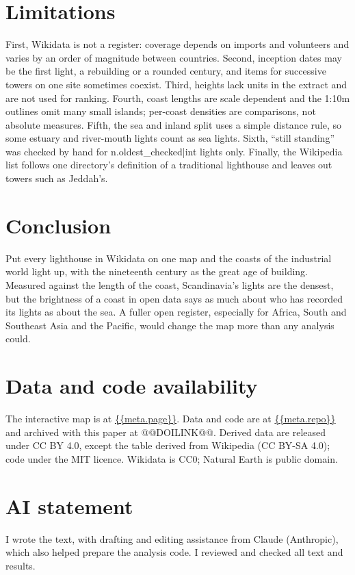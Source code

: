 \documentclass[11pt,a4paper]{article}
\begin{document}
\section{Limitations}
First, Wikidata is not a register: coverage depends on imports and volunteers and varies by an order of magnitude between countries. Second, inception dates may be the first light, a rebuilding or a rounded century, and items for successive towers on one site sometimes coexist. Third, heights lack units in the extract and are not used for ranking. Fourth, coast lengths are scale dependent and the 1:10m outlines omit many small islands; per-coast densities are comparisons, not absolute measures. Fifth, the sea and inland split uses a simple distance rule, so some estuary and river-mouth lights count as sea lights. Sixth, ``still standing'' was checked by hand for {{n.oldest_checked|int}} lights only. Finally, the Wikipedia list follows one directory's definition of a traditional lighthouse and leaves out towers such as Jeddah's.

\section{Conclusion}
Put every lighthouse in Wikidata on one map and the coasts of the industrial world light up, with the nineteenth century as the great age of building. Measured against the length of the coast, Scandinavia's lights are the densest, but the brightness of a coast in open data says as much about who has recorded its lights as about the sea. A fuller open register, especially for Africa, South and Southeast Asia and the Pacific, would change the map more than any analysis could.

\section*{Data and code availability}
The interactive map is at \url{{{meta.page}}}. Data and code are at \url{{{meta.repo}}} and archived with this paper at @@DOILINK@@. Derived data are released under CC BY 4.0, except the table derived from Wikipedia (CC BY-SA 4.0); code under the MIT licence. Wikidata is CC0; Natural Earth is public domain.

\section*{AI statement}
I wrote the text, with drafting and editing assistance from Claude (Anthropic), which also helped prepare the analysis code. I reviewed and checked all text and results.
\end{document}
